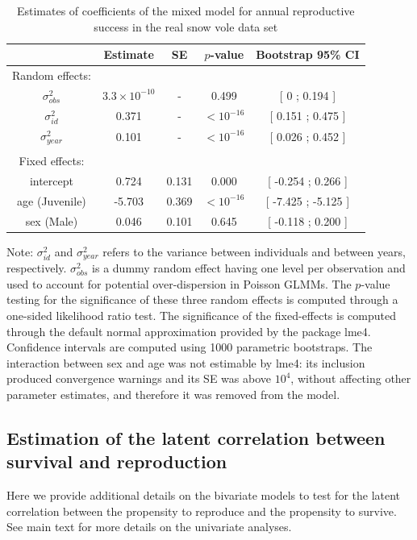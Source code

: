 \begin{table}[ht]
\caption{Estimates of coefficients of the mixed model for annual reproductive success in the real snow vole data set} 
\label{Rho_table}
\begin{center}
\footnotesize
\begin{tabular}{ccccc}
  \toprule
 & Estimate & SE & $p$-value & Bootstrap 95\% CI  \\ 
  \midrule
	Random effects:\\
$\sigma_{obs}^2$ & $3.3 \times 10^{-10}$ & - & 0.499 & [ 0 ; 0.194 ] \\ 
  $\sigma_{id}^2$ & 0.371 & - & $<10^{-16}$ & [ 0.151 ; 0.475 ] \\ 
  $\sigma_{year}^2$ & 0.101 & - & $<10^{-16}$ & [ 0.026 ; 0.452 ] \\ 
	\\
   Fixed effects:\\
intercept & 0.724 & 0.131 & 0.000 & [ -0.254 ; 0.266 ] \\ 
  age (Juvenile) & -5.703 & 0.369 & $<10^{-16}$ & [ -7.425 ; -5.125 ] \\ 
  sex (Male) & 0.046 & 0.101 & 0.645 & [ -0.118 ; 0.200 ] \\ 
	\bottomrule
\end{tabular}
\end{center}
{\scriptsize Note: $\sigma_{id}^2$ and $\sigma_{year}^2$ refers to the variance between individuals and between years, respectively. $\sigma_{obs}^2$ is a dummy random effect having one level per observation and used to account for potential over-dispersion in Poisson GLMMs. The $p$-value testing for the significance of these three random effects is computed through a one-sided likelihood ratio test. The significance of the fixed-effects is computed through the default normal approximation provided by the package lme4. Confidence intervals are computed using 1000 parametric bootstraps. The interaction between sex and age was not estimable by lme4: its inclusion produced convergence warnings and its SE was above $10^4$, without affecting other parameter estimates, and therefore it was removed from the model.}
\end{table}
\clearpage

\subsection{Estimation of the latent correlation between survival and reproduction}\label{ap:cor}
Here we provide additional details on the bivariate models to test for the latent correlation between the propensity to reproduce and the propensity to survive. See main text for more details on the univariate analyses.

